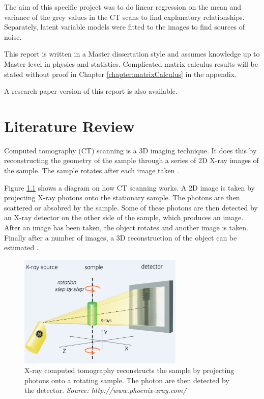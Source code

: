 \documentclass[12pt]{report}
\begin{document}
The aim of this specific project was to do linear regression on the mean and variance of the grey values in the CT scans to find explanatory relationships. Separately, latent variable models were fitted to the images to find sources of noise.

This report is written in a Master dissertation style and assumes knowledge up to Master level in physics and statistics. Complicated matrix calculus results will be stated without proof in Chapter \ref{chapter:matrixCalculus} in the appendix.

A research paper version of this report is also available.

\chapter{Literature Review}
Computed tomography (CT) scanning is a 3D imaging technique. It does this by reconstructing the geometry of the sample through a series of 2D X-ray images of the sample. The sample rotates after each image taken \cite{cantatore2011introduction}.

Figure \ref{fig:x_ray_ct} shows a diagram on how CT scanning works. A 2D image is taken by projecting X-ray photons onto the stationary sample. The photons are then scattered or absobred by the sample.  Some of these photons are then detected by an X-ray detector on the other side of the sample, which produces an image. After an image has been taken, the object rotates and another image is taken. Finally after a number of images, a 3D reconstruction of the object can be estimated \cite{cantatore2011introduction}.

\begin{figure}
\centering
\includegraphics[width=0.7\textwidth]{figures/x_ray_ct.png}
\caption{X-ray computed tomography reconstructs the sample by projecting photons onto a rotating sample. The photon are then detected by the detector. \emph{Source: http://www.phoenix-xray.com/}}
\label{fig:x_ray_ct}
\end{figure}
\end{document}
